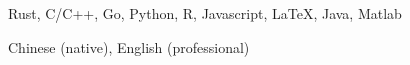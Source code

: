 \begin{cvskills}

   {Rust, C/C++, Go, Python, R, Javascript, \LaTeX, Java,
    Matlab}

   {Chinese (native), English (professional)}

\end{cvskills}

